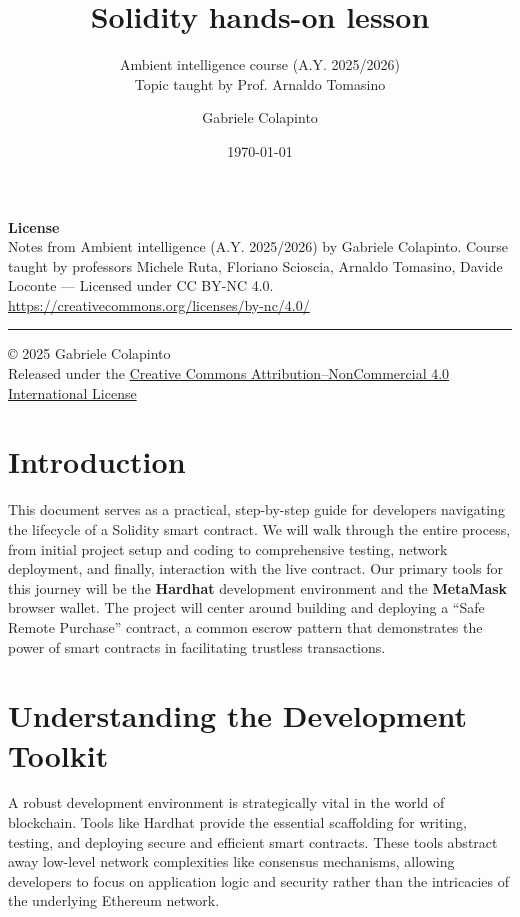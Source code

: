 \documentclass{scrbook}
\title{Solidity hands-on lesson}
\subtitle{Ambient intelligence course (A.Y. 2025/2026)\\Topic taught by Prof. Arnaldo Tomasino}
\author{Gabriele Colapinto}
\date{\today}
\begin{document}
\maketitle
\thispagestyle{empty}

{\Large\textbf{License}} \\
{Notes from Ambient intelligence (A.Y. 2025/2026) by Gabriele Colapinto. 
Course taught by professors Michele Ruta, Floriano Scioscia, Arnaldo Tomasino, Davide Loconte — 
Licensed under CC BY-NC 4.0.\\
\url{https://creativecommons.org/licenses/by-nc/4.0/}}

\vspace*{\fill}
\rule{\textwidth}{0.2pt}
\small{© 2025 Gabriele Colapinto \\
Released under the \href{https://creativecommons.org/licenses/by-nc/4.0/}{Creative Commons Attribution–NonCommercial 4.0 International License}}

\clearpage

\tableofcontents

\chapter{Introduction}

This document serves as a practical, step-by-step guide for developers navigating the lifecycle of a Solidity smart contract. We will walk through the entire process, from initial project setup and coding to comprehensive testing, network deployment, and finally, interaction with the live contract. Our primary tools for this journey will be the \textbf{Hardhat} development environment and the \textbf{MetaMask} browser wallet. The project will center around building and deploying a ``Safe Remote Purchase'' contract, a common escrow pattern that demonstrates the power of smart contracts in facilitating trustless transactions.

\chapter{Understanding the Development Toolkit}

A robust development environment is strategically vital in the world of blockchain. Tools like Hardhat provide the essential scaffolding for writing, testing, and deploying secure and efficient smart contracts. These tools abstract away low-level network complexities like consensus mechanisms, allowing developers to focus on application logic and security rather than the intricacies of the underlying Ethereum network.
\end{document}
